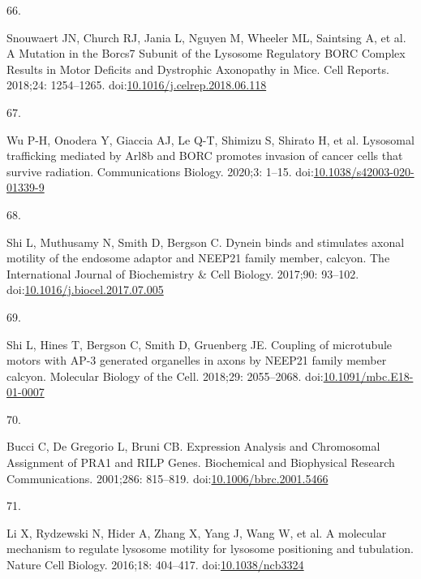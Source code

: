 \documentclass[
  12pt,
  a4paper,
]{book}
\newlength{\cslhangindent}
\newlength{\csllabelwidth}
\newlength{\cslentryspacingunit} %
\newenvironment{CSLReferences}[2] %
 {%
  \setlength{\parindent}{0pt}
  \ifodd #1
  \let\oldpar\par
  \def\par{\hangindent=\cslhangindent\oldpar}
  \fi
  \setlength{\parskip}{#2\cslentryspacingunit}
 }%
 {}
\newcommand{\CSLLeftMargin}[1]{\parbox[t]{\csllabelwidth}{#1}}
\newcommand{\CSLRightInline}[1]{\parbox[t]{\linewidth - \csllabelwidth}{#1}\break}
\begin{document}
\begin{CSLReferences}{0}{0}
\leavevmode{}%
\CSLLeftMargin{66. }%
\CSLRightInline{Snouwaert JN, Church RJ, Jania L, Nguyen M, Wheeler ML, Saintsing A, et al. A {Mutation} in the {Borcs7 Subunit} of the {Lysosome Regulatory BORC Complex Results} in {Motor Deficits} and {Dystrophic Axonopathy} in {Mice}. Cell Reports. 2018;24: 1254--1265. doi:\href{https://doi.org/10.1016/j.celrep.2018.06.118}{10.1016/j.celrep.2018.06.118}}

\leavevmode{}%
\CSLLeftMargin{67. }%
\CSLRightInline{Wu P-H, Onodera Y, Giaccia AJ, Le Q-T, Shimizu S, Shirato H, et al. Lysosomal trafficking mediated by {Arl8b} and {BORC} promotes invasion of cancer cells that survive radiation. Communications Biology. 2020;3: 1--15. doi:\href{https://doi.org/10.1038/s42003-020-01339-9}{10.1038/s42003-020-01339-9}}

\leavevmode{}%
\CSLLeftMargin{68. }%
\CSLRightInline{Shi L, Muthusamy N, Smith D, Bergson C. Dynein binds and stimulates axonal motility of the endosome adaptor and {NEEP21} family member, calcyon. The International Journal of Biochemistry \& Cell Biology. 2017;90: 93--102. doi:\href{https://doi.org/10.1016/j.biocel.2017.07.005}{10.1016/j.biocel.2017.07.005}}

\leavevmode{}%
\CSLLeftMargin{69. }%
\CSLRightInline{Shi L, Hines T, Bergson C, Smith D, Gruenberg JE. Coupling of microtubule motors with {AP-3} generated organelles in axons by {NEEP21} family member calcyon. Molecular Biology of the Cell. 2018;29: 2055--2068. doi:\href{https://doi.org/10.1091/mbc.E18-01-0007}{10.1091/mbc.E18-01-0007}}

\leavevmode{}%
\CSLLeftMargin{70. }%
\CSLRightInline{Bucci C, De Gregorio L, Bruni CB. Expression {Analysis} and {Chromosomal Assignment} of {PRA1} and {RILP Genes}. Biochemical and Biophysical Research Communications. 2001;286: 815--819. doi:\href{https://doi.org/10.1006/bbrc.2001.5466}{10.1006/bbrc.2001.5466}}

\leavevmode{}%
\CSLLeftMargin{71. }%
\CSLRightInline{Li X, Rydzewski N, Hider A, Zhang X, Yang J, Wang W, et al. A molecular mechanism to regulate lysosome motility for lysosome positioning and tubulation. Nature Cell Biology. 2016;18: 404--417. doi:\href{https://doi.org/10.1038/ncb3324}{10.1038/ncb3324}}


\end{CSLReferences}
\end{document}
